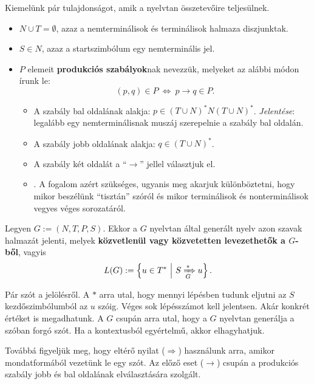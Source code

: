 Kiemelünk pár tulajdonságot, amik a nyelvtan összetevőire teljesülnek.
\begin{itemize}
	\item $N \cup T = \emptyset$, azaz a nemterminálisok és terminálisok halmaza diszjunktak.
	\item $S \in N$, azaz a startszimbólum egy nemterminális jel.
	\item $P$ elemeit \textbf{produkciós szabályok}nak nevezzük, melyeket az alábbi módon írunk le:
	\[ (p,q) \in P ~ \Longleftrightarrow ~ p \longrightarrow q \in P. \]
	\begin{itemize}
		\item A szabály bal oldalának alakja: $p \in (T \cup N)^* N(T \cup N)^*$. \textit{Jelentése}: legalább egy nemterminálisnak muszáj szerepelnie a szabály bal oldalán.
		\item A szabály jobb oldalának alakja: $q \in (T \cup N)^*$.
		\item A szabály két oldalát a ``$\longrightarrow$'' jellel választjuk el.
		\item {}. A fogalom azért szükséges, ugyanis meg akarjuk különböztetni, hogy mikor beszélünk ``tisztán'' szóról és mikor terminálisok és nonterminálisok vegyes véges sorozatáról.
	\end{itemize}
\end{itemize}

\begin{tcolorbox}
	\begin{definition}
		Legyen $G := (N,T,P,S)$. Ekkor a $G$ nyelvtan által generált nyelv azon szavak halmazát jelenti, melyek \textbf{közvetlenül vagy közvetetten levezethetők a $G$-ből}, vagyis 
		\[ L(G) := \left\{ u \in T^* ~ \middle\vert ~ S \xRightarrow[{G}]{*} u \right\}. \]
	\end{definition}
\end{tcolorbox}

Pár szót a jelölésről. A $*$ arra utal, hogy mennyi lépésben tudunk eljutni az $S$ kezdőszimbólumból az $u$ szóig. Véges sok lépésszámot kell jelentsen. Akár konkrét értéket is megadhatunk. A $G$ csupán arra utal, hogy a $G$ nyelvtan generálja a szóban forgó szót. Ha a kontextusból egyértelmű, akkor elhagyhatjuk.

Továbbá figyeljük meg, hogy eltérő nyilat ($\Longrightarrow$) használunk arra, amikor mondatformából vezetünk le egy szót. Az előző eset ($\longrightarrow$) csupán a produkciós szabály jobb és bal oldalának elválasztására szolgált.

